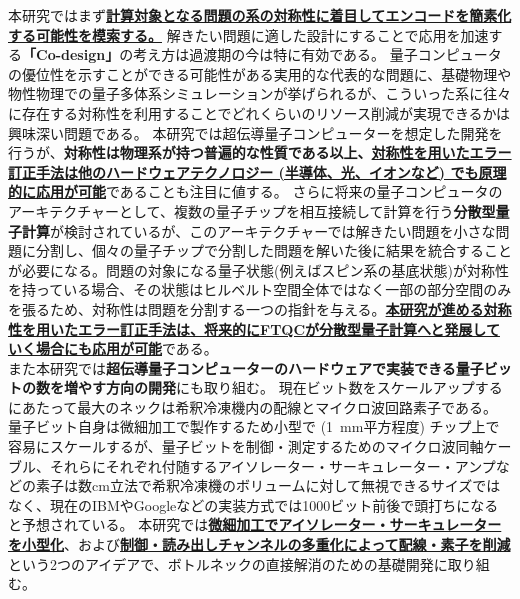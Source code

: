 \documentclass[11pt,a4j,dvipdfmx]{jarticle} 					%
\newcommand{\研究課題名}{誤り耐性量子コンピュータに向けた誤り訂正技術の開発(仮)}
\newcommand{\研究機関名}{東京大学}
\newcommand{\研究代表者氏名}{寺師弘二}
\newcommand{\研究期間の最終元号年度}{10}  %
\newcommand{\mybf}[1]{{\bfseries\sffamily#1}}
\begin{document}
本研究ではまず\mybf{\ul{計算対象となる問題の系の対称性に着目してエンコードを簡素化する可能性を模索する。}}
解きたい問題に適した設計にすることで応用を加速する\mybf{「Co-design」}の考え方は過渡期の今は特に有効である。
量子コンピュータの優位性を示すことができる可能性がある実用的な代表的な問題に、基礎物理や物性物理での量子多体系シミュレーションが挙げられるが、こういった系に往々に存在する対称性を利用することでどれくらいのリソース削減が実現できるかは興味深い問題である。
本研究では超伝導量子コンピューターを想定した開発を行うが、\mybf{対称性は物理系が持つ普遍的な性質である以上、\ul{対称性を用いたエラー訂正手法は他のハードウェアテクノロジー (半導体、光、イオンなど) でも原理的に応用が可能}}であることも注目に値する。
さらに将来の量子コンピュータのアーキテクチャーとして、複数の量子チップを相互接続して計算を行う\mybf{分散型量子計算}が検討されているが、このアーキテクチャーでは解きたい問題を小さな問題に分割し、個々の量子チップで分割した問題を解いた後に結果を統合することが必要になる。問題の対象になる量子状態(例えばスピン系の基底状態)が対称性を持っている場合、その状態はヒルベルト空間全体ではなく一部の部分空間のみを張るため、対称性は問題を分割する一つの指針を与える。\mybf{\ul{本研究が進める対称性を用いたエラー訂正手法は、将来的にFTQCが分散型量子計算へと発展していく場合にも応用が可能}}である。\\

また本研究では\mybf{超伝導量子コンピューターのハードウェアで実装できる量子ビットの数を増やす方向の開発}にも取り組む。
現在ビット数をスケールアップするにあたって最大のネックは希釈冷凍機内の配線とマイクロ波回路素子である。
量子ビット自身は微細加工で製作するため小型で (1~mm平方程度) チップ上で容易にスケールするが、量子ビットを制御・測定するためのマイクロ波同軸ケーブル、それらにそれぞれ付随するアイソレーター・サーキュレーター・アンプなどの素子は数cm立法で希釈冷凍機のボリュームに対して無視できるサイズではなく、現在のIBMやGoogleなどの実装方式では1000ビット前後で頭打ちになると予想されている。
本研究では\mybf{\ul{微細加工でアイソレーター・サーキュレーターを小型化}}、および\mybf{\ul{制御・読み出しチャンネルの多重化によって配線・素子を削減}}という2つのアイデアで、ボトルネックの直接解消のための基礎開発に取り組む。\\
\end{document}
